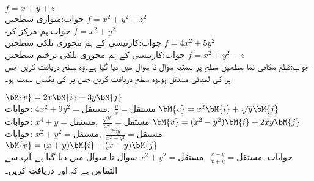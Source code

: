\quad
$f=x+y+z$\\
جواب:متوازی سطحیں
\quad
$f=x^2+y^2+z^2$\\
جواب:ہم مرکز کرہ
\quad
$f=x^2+y^2$\\
جواب:کارتیسی   کے ہم محوری نلکی سطحیں
\quad
$f=4x^2+5y^2$\\
جواب:کارتیسی   کے ہم محوری نلکی ترخیم سطحیں
\quad
$f=x^2+y^2-z$\\
جواب:قطع مکافی نما سطحیں
 سطح پر سمتیہ  سوال  تا سوال  میں دیا گیا ہے۔وہ سطح دریافت کریں جس پر  کی لمبائی مستقل ہو۔وہ سطح دریافت کریں جس پر   کی یکساں سمت ہو۔ 

\quad 
$\bM{v}=2x\bM{i}+3y\bM{j}$\\
جوابات:
$4x^2+9y^2=\text{مستقل},\,\, \tfrac{y}{x}=\text{مستقل}$
\quad 
$\bM{v}=x^2\bM{i}+\sqrt{y}\bM{j}$\\
جوابات:
$x^4+y=\text{مستقل},\,\, \tfrac{\sqrt{y}}{x^2}=\text{مستقل}$
\quad 
$\bM{v}=(x^2-y^2)\bM{i}+2xy\bM{j}$\\
جوابات:
$x^2+y^2=\text{مستقل},\,\, \tfrac{2xy}{x^2-y^2}=\text{مستقل}$
\quad 
$\bM{v}=(x+y)\bM{i}+(x-y)\bM{j}$\\
جوابات:
$x^2+y^2=\text{مستقل},\,\, \tfrac{x-y}{x+y}=\text{مستقل}$
سوال  تا سوال  میں  دیا گیا ہے۔آپ سے التماس ہے کہ  اور   دریافت کریں۔

